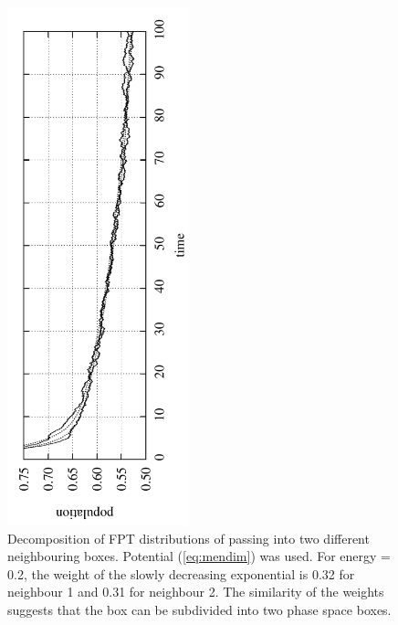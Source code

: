 \begin{figure}[h!]
\centering
\includegraphics[height=15cm, angle=270]{Images/mendim.pdf}
\caption[Distribution of FPT for a box with many minima.]{Decomposition of FPT distributions of passing into two different neighbouring boxes. Potential (\ref{eq:mendim}) was used. For energy = 0.2, the weight of the slowly decreasing exponential is 0.32 for neighbour 1 and 0.31 for neighbour 2. The similarity of the weights suggests that the box can be subdivided into two phase space boxes.}
\label{fig:mendim-nocen}
\end{figure}


